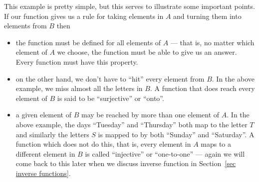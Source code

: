 This example is pretty simple, but this serves to illustrate some important
points. If our function gives us a rule for taking elements in $A$ and turning
them into elements from $B$ then
\begin{itemize}
 \item the function must be defined for all elements of $A$ --- that is, no
matter which element of $A$ we choose, the function must be able to give us an
answer. Every function must have this property.
 \item on the other hand, we don't have to ``hit'' every element from $B$. In
the above example, we miss almost all the letters in $B$. A function that does
reach every element of $B$ is said to be ``surjective'' or ``onto''.
\item a given element of $B$ may be reached by more than one element of $A$. In
the above example, the days ``Tuesday'' and ``Thursday'' both map to the
letter $T$ and similarly the letters $S$ is mapped to by both
``Sunday'' and ``Saturday''. A function which does not do this, that is, every
element in $A$ maps to a different element in $B$ is called ``injective'' or
``one-to-one'' --- again we will come back to this later when we discuss inverse function
in Section~\ref{sec inverse functions}.
\end{itemize}

